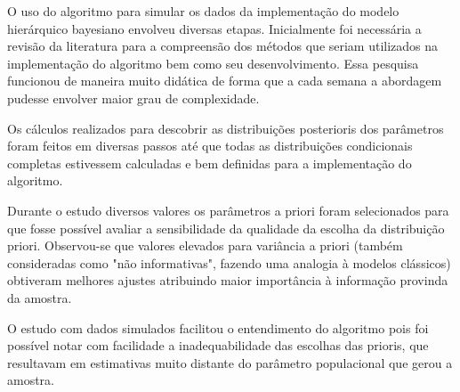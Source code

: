 \documentclass[12pt,a4paper,header]{abnt}
\begin{document}
O uso do algoritmo para simular os dados da implementação do modelo hierárquico bayesiano envolveu diversas etapas. Inicialmente foi necessária a revisão da literatura para a compreensão dos métodos que seriam utilizados na implementação do algoritmo bem como seu desenvolvimento. Essa pesquisa funcionou de maneira muito didática de forma que a cada semana a abordagem pudesse envolver maior grau de complexidade.

Os cálculos realizados para descobrir as distribuições posterioris dos parâmetros foram feitos em diversas passos até que todas as distribuições condicionais completas estivessem calculadas e bem definidas para a implementação do algoritmo.

Durante o estudo diversos valores os parâmetros a priori foram selecionados para que fosse possível avaliar a sensibilidade da qualidade da escolha da distribuição priori. Observou-se que valores elevados para variância a priori (também consideradas como "não informativas", fazendo uma analogia à modelos clássicos) obtiveram melhores ajustes atribuindo maior importância à informação provinda da amostra.

O estudo com dados simulados facilitou o entendimento do algoritmo pois foi possível notar com facilidade a inadequabilidade das escolhas das prioris, que resultavam em estimativas muito distante do parâmetro populacional que gerou a amostra.












\end{document}
